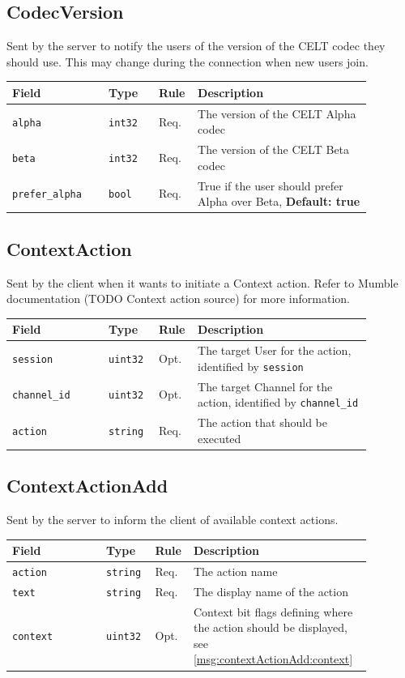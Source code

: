 \documentclass[11pt]{article} %
\newenvironment{mumbleMessageEx}
{%
	\small
	\renewcommand\arraystretch{1.5}
	\begin{tabular}{p{0.25\linewidth}p{0.13\linewidth}p{0.05\linewidth}p{0.45\linewidth}}
	Field & Type & Rule & Description \\
	\hline
}
{%
	\end{tabular}
	\renewcommand\arraystretch{1.0}
}
\newcommand{\mumbleMessageExItem}[4]{ \texttt{#1} & \texttt{#2} & #3 & #4 \\ }
\begin{document}
\subsection{CodecVersion}
\label{msg:codecVersion}

Sent by the server to notify the users of the version of the CELT codec they should use. This may change during the connection when new users join.

\begin{mumbleMessageEx}
\mumbleMessageExItem{alpha}{int32}{Req.}{The version of the CELT Alpha codec}
\mumbleMessageExItem{beta}{int32}{Req.}{The version of the CELT Beta codec}
\mumbleMessageExItem{prefer\_alpha}{bool}{Req.}{True if the user should prefer Alpha over Beta, \textbf{Default: true}}
\end{mumbleMessageEx}

\subsection{ContextAction}
\label{msg:contextAction}

Sent by the client when it wants to initiate a Context action. Refer to Mumble documentation (TODO Context action source) for more information.

\begin{mumbleMessageEx}
\mumbleMessageExItem{session}{uint32}{Opt.}{The target User for the action, identified by \texttt{session}}
\mumbleMessageExItem{channel\_id}{uint32}{Opt.}{The target Channel for the action, identified by \texttt{channel\_id}}
\mumbleMessageExItem{action}{string}{Req.}{The action that should be executed}
\end{mumbleMessageEx}

\subsection{ContextActionAdd}
\label{msg:contextActionAdd}

Sent by the server to inform the client of available context actions.

\begin{mumbleMessageEx}
\mumbleMessageExItem{action}{string}{Req.}{The action name}
\mumbleMessageExItem{text}{string}{Req.}{The display name of the action}
\mumbleMessageExItem{context}{uint32}{Opt.}{Context bit flags defining where the action should be displayed, see \ref{msg:contextActionAdd:context}}
\end{mumbleMessageEx}
\end{document}
